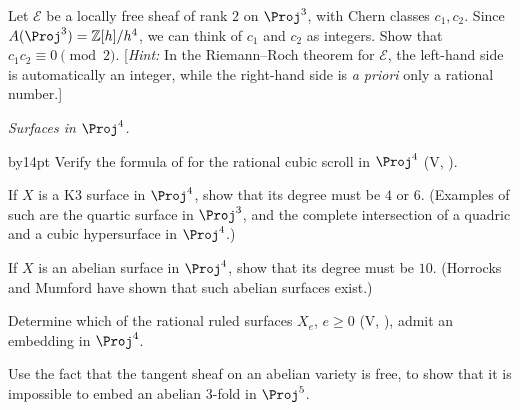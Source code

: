 {{\smallskip
\noindent\hypertarget{ex-A-6.8}{}Let $\mathcal E$ be a locally free sheaf of rank $2$ on $\Proj^3$, with Chern classes $c_1,c_2$. Since $A(\Proj^3)=\mathbb Z[h]/h^4$, we can think of $c_1$ and $c_2$ as integers. Show that $c_1c_2\equiv0\pmod 2$. [\emph{Hint:} In the Riemann--Roch theorem for $\mathcal E$, the left-hand side is automatically an integer, while the right-hand side is \emph{a priori} only a rational number.]

\smallskip
\noindent\hypertarget{ex-A-6.9}{}\emph{Surfaces in $\Proj^4$.}\par
{\advance\leftskip by14pt
\noindent\hypertarget{ex-A-6.9a}{}Verify the formula of  for the rational cubic scroll in $\Proj^4$ (V, ).

\noindent\hypertarget{ex-A-6.9b}{}If $X$ is a K3 surface in $\Proj^4$, show that its degree must be $4$ or $6$. (Examples of such are the quartic surface in $\Proj^3$, and the complete intersection of a quadric and a cubic hypersurface in $\Proj^4$.)

\noindent\hypertarget{ex-A-6.9c}{}If $X$ is an abelian surface in $\Proj^4$, show that its degree must be $10$. (Horrocks and Mumford  have shown that such abelian surfaces exist.)

\noindent\hypertarget{ex-A-6.9d}{}Determine which of the rational ruled surfaces $X_e$, $e\geq0$ (V, ), admit an embedding in $\Proj^4$.\par}

\smallskip
\noindent\hypertarget{ex-A-6.10}{}Use the fact that the tangent sheaf on an abelian variety is free, to show that it is impossible to embed an abelian $3$-fold in $\Proj^5$.\par}
}
